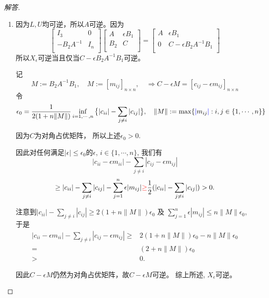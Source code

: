 \documentclass[UTF8]{ctexart}
\begin{document}
\begin{proof}[解答]
\begin{enumerate}
\item
因为$L,U$均可逆，所以$A$可逆。因为
\[
\begin{bmatrix}
I_3& 0\\
 -B_2 A^{-1}&I_n\\
\end{bmatrix} \begin{bmatrix}
A& \epsilon B_1\\
 B_2 &C\\
\end{bmatrix} = \begin{bmatrix}
A& \epsilon B_1\\
0 &C-\epsilon B_2 A^{-1}B_1\\
\end{bmatrix}
\]
所以$X_{\epsilon}$可逆当且仅当$C-\epsilon B_2 A^{-1}B_1$可逆。

记
\[
M:=B_2A^{-1}B_1, \quad M:=[m_{ij}]_{n\times n},\quad \Longrightarrow C-\epsilon M=[c_{ij}-\epsilon m_{ij}]_{n\times n}
\]
令
\[
\epsilon_{0}= \frac{1}{2(1+n\|M\|)}\inf_{i=1,\cdots, n} \big\{|c_{ii}|-\sum_{j\neq i} |c_{ij}|\big\}, \quad \| M\|:=\max\{{\color{blue}\mid}m_{ij}{\color{blue}\mid}:i,j\in\{1,\cdots, n\}\}
\]

因为$C$为对角占优矩阵，
所以上述$\epsilon_0>0$.%


因此对任何满足$ |\epsilon|\leq \epsilon_0$的$\epsilon$, $i\in\{1,\cdots, n\}$, 我们有
\[
|c_{ii}-\epsilon m_{ii}|-\sum_{j\neq i} |c_{ij}-\epsilon m_{ij}|
\]
\[
\geq |c_{ii}|-\sum_{j\neq i} |c_{ij}|- \sum_{j=1}^n \epsilon |m_{ij}|{\color{red}\geq} \frac{1}{2} ( |c_{ii}|-\sum_{j\neq i} |c_{ij}|)> 0.
\]

{\color{blue}
注意到$|c_{ii}|-\sum_{j\neq i} |c_{ij}| \geq 2(1+n\|M\|)\epsilon_0$ 及 $\sum_{j=1}^n \epsilon |m_{ij}|\leq n\|M\|\epsilon_0$, 于是
\begin{align*}
    |c_{ii}-\epsilon m_{ii}|-\sum_{j\neq i} |c_{ij}-\epsilon m_{ij}|\geq &2(1+n\|M\|)\epsilon_0-n\|M\|\epsilon_0\\
    =&(2+n\|M\|)\epsilon_0\\
    >&0.
\end{align*}

}
因此$C-\epsilon M$仍然为对角占优矩阵，故$C-\epsilon M$可逆。 综上所述, $X_\epsilon$可逆。
\end{enumerate}
\end{proof}

\clearpage
\listofchanges
\end{document}
